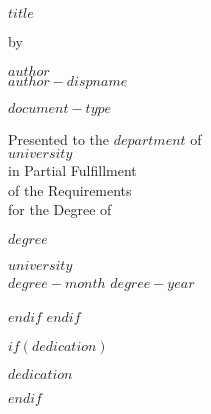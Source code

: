 \documentclass[letterpaper, $if(page-layout)$$page-layout$$else$nobind$endif$]{templates/ociamthesis}
\begin{document}
\begin{romanpages}
\newpage
\thispagestyle{empty} %
\begin{center}
  
  \begin{spacing}{2}
    {\Large{\textbf{$title$}}}
  \end{spacing}
  
  \vspace*{24pt}

  \begin{spacing}{1.4}
    by\\
    
    \vspace*{24pt}
    
    {\Large{\textbf{
      $author$\\
      \vspace*{10pt}
      {\Huge {\dispnamefont $author-dispname$}}
    }}}
    
    \vspace*{72pt}
    
    {\Large{\textbf{$document-type$}}}\\
    
    \vspace*{24pt}
    
    Presented to the $department$ of\\
    $university$\\
    in Partial Fulfillment\\
    of the Requirements\\
    for the Degree of\\
    
    \vspace*{30pt}
    
    {\Large{\textbf{$degree$}}}\\
    
    \vfill

    {\large{$university$\\
    $degree-month$ $degree-year$}}

  \end{spacing}
\end{center}



$endif$
$endif$

$if(dedication)$
\begin{dedication}
  $dedication$
\end{dedication}
$endif$


\end{romanpages}
\end{document}
